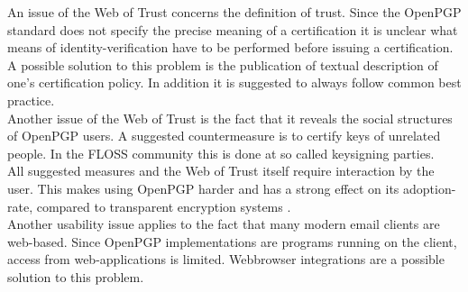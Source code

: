 An issue of the Web of Trust concerns the definition of trust. Since the OpenPGP standard \cite{RFC4880} does not specify the precise meaning of a certification it is unclear what means of identity-verification have to be performed before issuing a certification. A possible solution to this problem is the publication of textual description of one's certification policy. In addition it is suggested to always follow common best practice.   \\

Another issue of the Web of Trust is the fact that it reveals the social structures of OpenPGP users. A suggested countermeasure is to certify keys of unrelated people. In the FLOSS community this is done at so called keysigning parties.  \\

All suggested measures and the Web of Trust itself require interaction by the user. This makes using OpenPGP harder and has a strong effect on its adoption-rate, compared to transparent encryption systems \cite{Green2014}. \\

Another usability issue applies to the fact that many modern email clients are web-based. Since OpenPGP implementations are programs running on the client, access from web-applications is limited. Webbrowser integrations are a possible solution to this problem. 














